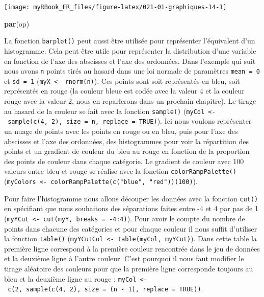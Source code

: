 \documentclass[twoside,symmetric]{book}
\newenvironment{Shaded}{}{}
\newcommand{\KeywordTok}[1]{\textbf{#1}}
\newcommand{\NormalTok}[1]{#1}
\begin{document}
\texttt{[image: myRBook\_FR\_files/figure-latex/021-01-graphiques-14-1]}

\begin{Shaded}
\begin{Highlighting}[]
\KeywordTok{par}\NormalTok{(op)}
\end{Highlighting}
\end{Shaded}

La fonction \texttt{barplot()} peut aussi être utilisée pour représenter l'équivalent d'un histogramme. Cela peut être utile pour représenter la distribution d'une variable en fonction de l'axe des abscisses et l'axe des ordonnées. Dans l'exemple qui suit nous avons \texttt{n} points tirés au hasard dans une loi normale de paramètres \texttt{mean\ =\ 0} et \texttt{sd\ =\ 1} (\texttt{myX\ \textless{}-\ rnorm(n)}). Ces points sont soit représentés en bleu, soit représentés en rouge (la couleur bleue est codée avec la valeur 4 et la couleur rouge avec la valeur 2, nous en reparlerons dans un prochain chapitre). Le tirage au hasard de la couleur se fait avec la fonction \texttt{sample()} (\texttt{myCol\ \textless{}-\ sample(c(4,\ 2),\ size\ =\ n,\ replace\ =\ TRUE)}). Ici nous voulons représenter un nuage de points avec les points en rouge ou en bleu, puis pour l'axe des abscisses et l'axe des ordonnées, des histogrammes pour voir la répartition des points et un gradient de couleur du bleu au rouge en fonction de la proportion des points de couleur dans chaque catégorie. Le gradient de couleur avec 100 valeurs entre bleu et rouge se réalise avec la fonction \texttt{colorRampPalette()} (\texttt{myColors\ \textless{}-\ colorRampPalette(c("blue",\ "red"))(100)}).

Pour faire l'histogramme nous allons découper les données avec la fonction \texttt{cut()} en spécifiant que nous souhaitons des séparations faites entre -4 et 4 par pas de 1 (\texttt{myYCut\ \textless{}-\ cut(myY,\ breaks\ =\ -4:4)}). Pour avoir le compte du nombre de points dans chacune des catégories et pour chaque couleur il nous suffit d'utiliser la fonction \texttt{table()} (\texttt{myYCutCol\ \textless{}-\ table(myCol,\ myYCut)}). Dans cette table la première ligne correspond à la première couleur rencontrée dans le jeu de données et la deuxième ligne à l'autre couleur. C'est pourquoi il nous faut modifier le tirage aléatoire des couleurs pour que la première ligne corresponde toujours au bleu et la deuxième ligne au rouge : \texttt{myCol\ \textless{}-\ c(2,\ sample(c(4,\ 2),\ size\ =\ (n\ -\ 1),\ replace\ =\ TRUE))}.
\end{document}
